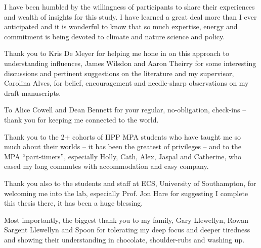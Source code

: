 \fi
\begin{acknowledgements}
I have been humbled by the willingness of participants to share their experiences and wealth of insights for this study. I have learned a great deal more than I ever anticipated and it is wonderful to know that so much expertise, energy and commitment is being devoted to climate and nature science and policy. 

Thank you to Kris De Meyer for helping me hone in on this approach to understanding influences, James Wilsdon and Aaron Theirry for some interesting discussions and pertinent suggestions on the literature and my supervisor, Carolina Alves, for belief, encouragement and needle-sharp observations on my draft manuscripts.

To Alice Cowell and Dean Bennett for your regular, no-obligation, check-ins -- thank you for keeping me connected to the world.

Thank you to the 2+ cohorts of IIPP MPA students who have taught me so much about their worlds -- it has been the greatest of privileges -- and to the MPA ``part-timers'', especially Holly, Cath, Alex, Jaspal and Catherine, who eased my long commutes with accommodation and easy company.

Thank you also to the students and staff at ECS, University of Southampton, for welcoming me into the lab, especially Prof. Jon Hare for suggesting I complete this thesis there, it has been a huge blessing. %

Most importantly, the biggest thank you to my family, Gary Llewellyn, Rowan Sargent Llewellyn and Spoon for tolerating my deep focus and deeper tiredness and showing their understanding in chocolate, shoulder-rubs and washing up.
\end{acknowledgements}


\setcounter{tocdepth}{2} 

\tableofcontents
\listoffigures
\listoftables
%
\printglossary[title=List of Abbreviations,type=\acronymtype]
